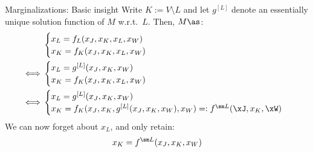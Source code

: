 \begin{frame}{Marginalizations: Basic insight}
  Write $K := V \setminus L$ and let $g^{[L]}$ denote an essentially unique solution function of $M$ w.r.t.\ $L$.
  Then, $M\as$:
    \begin{equation*}\begin{split}
  & \begin{cases}
    x_L = f_L(x_J,x_K,x_L,x_W) \\
    x_K = f_K(x_J,x_K,x_L,x_W) \\
  \end{cases} \\
  \iff & \begin{cases}
    x_L = g^{[L]}(x_J,x_K,x_W) \\
    x_K = f_K(x_J,x_K,x_L,x_W) \\
  \end{cases}  \\
  \iff & \begin{cases}
    x_L = g^{[L]}(x_J,x_K,x_W) \\
    x_K = f_K(x_J,x_K,g^{[L]}(x_J,x_K,x_W),x_W) =: f^{\sm L}(\xJ,x_{K},\xW) \\
  \end{cases} \\
  \end{split}\end{equation*}
  We can now forget about $x_L$, and only retain:
  $$x_K = f^{\sm L}(x_J,x_K,x_W)$$
\end{frame}

